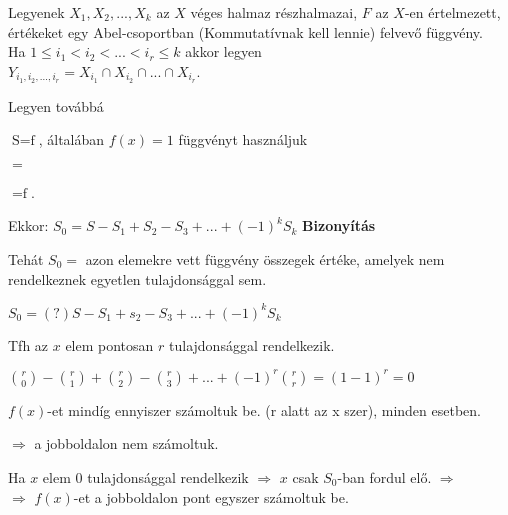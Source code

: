 \begin{frame}
  \begin{tcolorbox}[title={Tétel: Logikai szita formula}]
    Legyenek $X_1, X_2, ..., X_k$ az $X$ véges halmaz részhalmazai, $F$ az $X$-en értelmezett, értékeket egy Abel-csoportban (Kommutatívnak kell lennie) felvevő függvény.\\
    Ha $1 \leq i_1 < i_2 < ... < i_r \leq k$ akkor legyen\\
    $Y_{i_1, i_2, ..., i_r} = X_{i_1} \cap X_{i_2} \cap ... \cap X_{i_r}$.\\
    \mmedskip

    Legyen továbbá
    \mmedskip

    $\displaystyle \mathop{S = \sum_{x \in X} f(x)}$, általában $f(x) = 1$ függvényt használjuk\\
    \mmedskip

    $\displaystyle \mathop{S_r = \sum_{1 \leq i_1 < i_2 < ... < i_r \leq k} (\sum_{x \in Y_{i_1, i_2, ..., i_r}} f(x))}$ \\
    \mmedskip

    $\displaystyle \mathop{S_0 = \sum_{x \in X \setminus \bigcup^k_{i = 1} X_i} f(x)}$.\\
    \mmedskip

    Ekkor: $S_0 = S - S_1 + S_2 - S_3 + ... + (-1)^kS_k$
  \tcblower
    \textbf{Bizonyítás}\\
    \mmedskip

    Tehát $S_0 =$ azon elemekre vett függvény összegek értéke, amelyek nem rendelkeznek egyetlen tulajdonsággal sem.\\
    \mmedskip

    $S_0 =(?) S - S_1 + s_2 - S_3 + ... + (-1)^k S_k$\\
    \mmedskip

    Tfh az $x$ elem pontosan $r$ tulajdonsággal rendelkezik.\\
    \mmedskip

    ${r \choose 0} - {r \choose 1} + {r \choose 2} - {r \choose 3} + ... + (-1)^r {r \choose r} = (1 - 1)^r = 0$\\
    \msmallskip
    
    $f(x)$-et mindíg ennyiszer számoltuk be. (r alatt az x szer), minden esetben.\\
    \mbigskip

    $\Rightarrow$ a jobboldalon nem számoltuk.\\
    \mbigskip

    Ha $x$ elem $0$ tulajdonsággal rendelkezik $\Rightarrow$ $x$ csak $S_0$-ban fordul elő. $\Rightarrow$\\
    $\Rightarrow$ $f(x)$-et a jobboldalon pont egyszer számoltuk be.
  \end{tcolorbox}
\end{frame}



